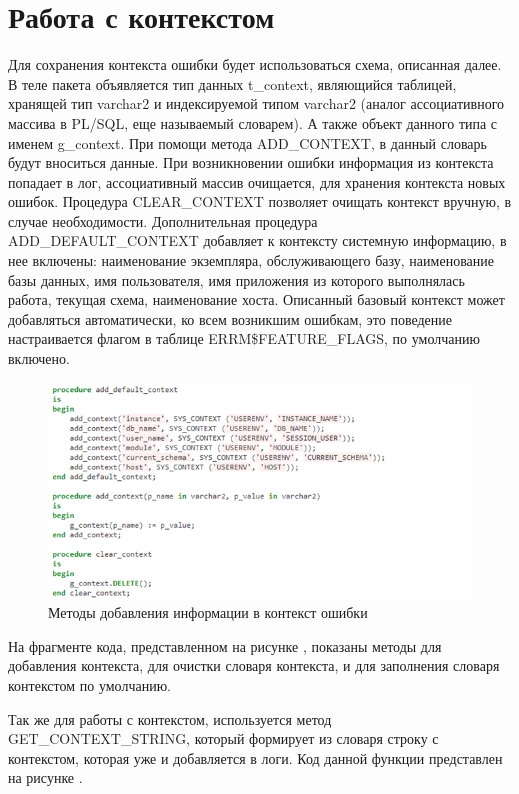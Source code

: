 \section{Работа с контекстом} \label{ch3:sec8}

Для сохранения контекста ошибки будет использоваться схема, описанная далее. В теле пакета объявляется тип данных t\_context, являющийся таблицей, хранящей тип varchar2 и индексируемой типом varchar2 (аналог ассоциативного массива в PL/SQL, еще называемый словарем). А также объект данного типа с именем g\_context. При помощи метода ADD\_CONTEXT, в данный словарь будут вноситься данные. При возникновении ошибки информация из контекста попадает в лог, ассоциативный массив очищается, для хранения контекста новых ошибок. Процедура CLEAR\_CONTEXT позволяет очищать контекст вручную, в случае необходимости. 
Дополнительная процедура ADD\_DEFAULT\_CONTEXT добавляет к контексту системную информацию, в нее включены: наименование экземпляра, обслуживающего базу, наименование базы данных, имя пользователя, имя приложения из которого выполнялась работа, текущая схема, наименование хоста. Описанный базовый контекст может добавляться автоматически, ко всем возникшим ошибкам, это поведение настраивается флагом в таблице ERRM\$FEATURE\_FLAGS, по умолчанию включено.  

\begin{figure}[ht!] 
	\center
	\includegraphics [scale=1] {my_folder/img/c3_add_context_code.png}
	\caption{Методы добавления информации в контекст ошибки} 
	\label{fig:c3_add_context_code}  
\end{figure}
\FloatBarrier

На фрагменте кода, представленном на рисунке , показаны методы для добавления контекста, для очистки словаря контекста, и для заполнения словаря контекстом по умолчанию. 

Так же для работы с контекстом, используется метод GET\_CONTEXT\_STRING, который формирует из словаря строку с контекстом, которая уже и добавляется в логи. Код данной функции представлен на рисунке .


